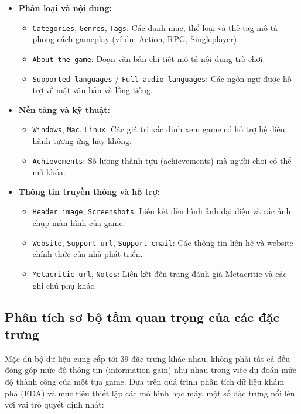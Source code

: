 \begin{itemize}
    \item \textbf{Phân loại và nội dung:}
    \begin{itemize}
        \item \texttt{Categories}, \texttt{Genres}, \texttt{Tags}: Các danh mục, thể loại và thẻ tag mô tả phong cách gameplay (ví dụ: Action, RPG, Singleplayer).
        \item \texttt{About the game}: Đoạn văn bản chi tiết mô tả nội dung trò chơi.
        \item \texttt{Supported languages} / \texttt{Full audio languages}: Các ngôn ngữ được hỗ trợ về mặt văn bản và lồng tiếng.
    \end{itemize}

    \item \textbf{Nền tảng và kỹ thuật:}
    \begin{itemize}
        \item \texttt{Windows}, \texttt{Mac}, \texttt{Linux}: Các giá trị xác định xem game có hỗ trợ hệ điều hành tương ứng hay không.
        \item \texttt{Achievements}: Số lượng thành tựu (achievements) mà người chơi có thể mở khóa.
    \end{itemize}

    \item \textbf{Thông tin truyền thông và hỗ trợ:}
    \begin{itemize}
        \item \texttt{Header image}, \texttt{Screenshots}: Liên kết đến hình ảnh đại diện và các ảnh chụp màn hình của game.
        \item \texttt{Website}, \texttt{Support url}, \texttt{Support email}: Các thông tin liên hệ và website chính thức của nhà phát triển.
        \item \texttt{Metacritic url}, \texttt{Notes}: Liên kết đến trang đánh giá Metacritic và các ghi chú phụ khác.
    \end{itemize}
\end{itemize}

\subsection{Phân tích sơ bộ tầm quan trọng của các đặc trưng}
\hspace{1cm} Mặc dù bộ dữ liệu cung cấp tới 39 đặc trưng khác nhau, không phải tất cả đều đóng góp mức độ thông tin (information gain) như nhau trong việc dự đoán mức độ thành công của một tựa game. Dựa trên quá trình phân tích dữ liệu khám phá (EDA) và mục tiêu thiết lập các mô hình học máy, một số đặc trưng nổi lên với vai trò quyết định nhất:

